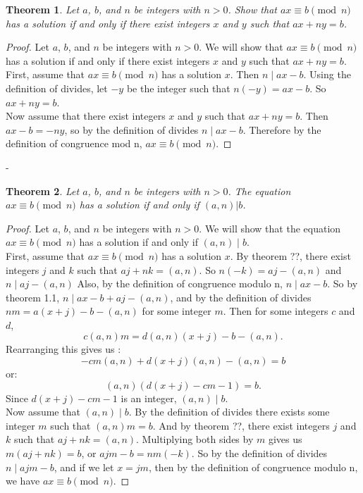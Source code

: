 \documentclass[12pt,leqno]{article}
\numberwithin{equation}{section}
\newtheorem{thm}{Theorem}[section]
\theoremstyle{definition}
\begin{document}
\begin{thm}
Let $a$, $b$, and $n$ be integers with $n > 0$.  Show that $ax
\equiv b \pmod{n}$ has a solution if and only if there exist
integers $x$ and $y$ such that $ax + ny = b$.
\end{thm}
\begin{proof}[Proof]
Let $a$, $b$, and $n$ be integers with $n > 0$.  We will show that $ax \equiv b \pmod{n}$ has a solution if and only if there exist integers $x$ and $y$ such that $ax + ny = b$. \\
First, assume that $ax \equiv b \pmod{n}$ has a solution $x$.  Then $n \mid ax - b$.  Using the definition of divides, let $-y$ be the integer such that $n(-y) = ax - b$.  So $ax + ny = b$.\\
Now assume that there exist integers $x$ and $y$ such that $ax + ny = b$.  Then $ax - b = -ny$, so by the definition of divides $n \mid ax - b$.  Therefore by the definition of congruence mod n, $ax \equiv b \pmod{n}$.
\end{proof}
-
\begin{thm}
Let $a$, $b$, and $n$ be integers with $n > 0$. The equation $ax
\equiv b \pmod{n}$ has a solution if and only if $(a, n)|b$.
\end{thm}

\begin{proof}[Proof]
Let $a$, $b$, and $n$ be integers with $n > 0$. We will show that the equation $ax \equiv b \pmod{n}$ has a solution if and only if $(a, n) \mid b$.\\

First, assume that $ax \equiv b \pmod{n}$ has a solution $x$.  By theorem ??, there exist integers $j$ and $k$ such that $aj + nk = (a, n)$.  So $n(-k) = aj - (a, n)$ and $n \mid aj - (a, n)$ Also, by the definition of congruence modulo n, $n \mid ax - b$.  So by theorem 1.1, $n \mid ax - b + aj - (a, n)$, and by the definition of divides $nm = a(x+j) - b - (a, n)$ for some integer $m$.  Then for some integers $c$ and $d$, 
\[c(a, n)m = d(a, n)(x+j) - b - (a, n).\]
Rearranging this gives us :
\[-cm(a, n) + d(x+j)(a, n) - (a, n) = b\]
or:
\[(a, n)(d(x+j) - cm - 1) = b.\]
Since $d(x+j) - cm - 1$ is an integer, $(a, n) \mid b$.\\

Now assume that $(a, n) \mid b$.  By the definition of divides there exists some integer $m$ such that $(a, n)m = b$.  And by theorem ??, there exist integers $j$ and $k$ such that $aj + nk = (a, n)$.  Multiplying both sides by $m$ gives us $m(aj + nk) = b$, or $ajm - b = nm(-k)$.  So by the definition of divides $n \mid ajm - b$, and if we let $x = jm$, then by the definition of congruence modulo n, we have $ax \equiv b \pmod{n}$.
\end{proof}
\end{document}
